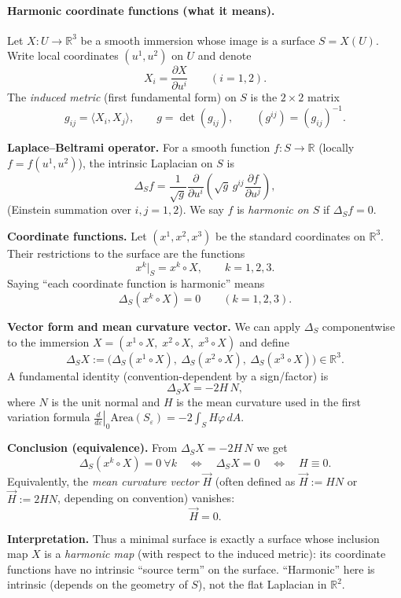 \documentclass[12pt,a4paper]{article}
\theoremstyle{plain}
\theoremstyle{definition}      %
\begin{document}
	
\paragraph{Harmonic coordinate functions (what it means).}
Let $X\colon U\to\mathbb{R}^3$ be a smooth immersion whose image is a surface $S=X(U)$.
Write local coordinates $(u^1,u^2)$ on $U$ and denote
\[
X_i=\frac{\partial X}{\partial u^i}\qquad (i=1,2).
\]
The \emph{induced metric} (first fundamental form) on $S$ is the $2\times 2$ matrix
\[
g_{ij}=\langle X_i,X_j\rangle,\qquad g=\det(g_{ij}),\qquad (g^{ij})=(g_{ij})^{-1}.
\]

\medskip
\textbf{Laplace--Beltrami operator.}
For a smooth function $f\colon S\to\mathbb{R}$ (locally $f=f(u^1,u^2)$), the intrinsic Laplacian on $S$ is
\[
\Delta_S f
=\frac{1}{\sqrt{g}}\frac{\partial}{\partial u^i}
\left(\sqrt{g}\,g^{ij}\frac{\partial f}{\partial u^j}\right),
\]
(Einstein summation over $i,j=1,2$).  
We say $f$ is \emph{harmonic on $S$} if $\Delta_S f=0$.

\medskip
\textbf{Coordinate functions.}
Let $(x^1,x^2,x^3)$ be the standard coordinates on $\mathbb{R}^3$.
Their restrictions to the surface are the functions
\[
x^k|_S = x^k\circ X,\qquad k=1,2,3.
\]
Saying ``each coordinate function is harmonic'' means
\[
\Delta_S (x^k\circ X)=0\qquad (k=1,2,3).
\]

\medskip
\textbf{Vector form and mean curvature vector.}
We can apply $\Delta_S$ componentwise to the immersion $X=(x^1\circ X,\;x^2\circ X,\;x^3\circ X)$ and define
\[
\Delta_S X := \bigl(\Delta_S(x^1\circ X),\ \Delta_S(x^2\circ X),\ \Delta_S(x^3\circ X)\bigr)\in\mathbb{R}^3.
\]
A fundamental identity (convention-dependent by a sign/factor) is
\[
\Delta_S X = -2H\,N,
\]
where $N$ is the unit normal and $H$ is the mean curvature used in the first variation formula
$\left.\frac{d}{d\varepsilon}\right|_{0}\!\mathrm{Area}(S_\varepsilon)=-2\int_S H\varphi\,dA$.

\medskip
\textbf{Conclusion (equivalence).}
From $\Delta_S X = -2H\,N$ we get
\[
\Delta_S(x^k\circ X)=0\ \forall k
\quad\Longleftrightarrow\quad
\Delta_S X=0
\quad\Longleftrightarrow\quad
H\equiv 0.
\]
Equivalently, the \emph{mean curvature vector} $\vec H$ (often defined as $\vec H := HN$ or $\vec H:=2HN$,
depending on convention) vanishes:
\[
\vec H=0.
\]

\medskip
\textbf{Interpretation.}
Thus a minimal surface is exactly a surface whose inclusion map $X$ is a \emph{harmonic map}
(with respect to the induced metric): its coordinate functions have no intrinsic ``source term'' on the surface.
``Harmonic'' here is intrinsic (depends on the geometry of $S$), not the flat Laplacian in $\mathbb{R}^2$.
\end{document}
